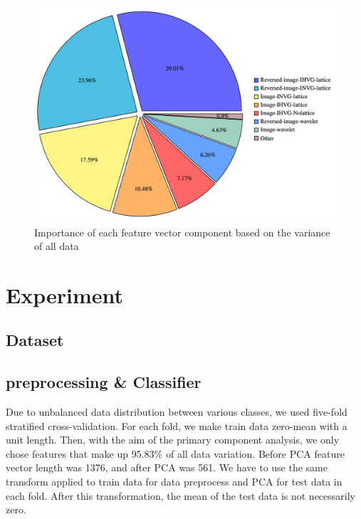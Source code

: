 \documentclass[conference]{IEEEtran}
\begin{document}
\begin{figure}[tbh]
  \includegraphics[width=1\linewidth]{PCA_piechart.png}
      \caption{Importance of each feature vector component based on the variance of all data}
  \label{fig: PCA1}
\end{figure}





\section{Experiment}
\subsection{\textbf{Dataset}}
\subsection{\textbf{preprocessing \& Classifier}}

Due to unbalanced data distribution between various classes, we used five-fold stratified cross-validation. For each fold, we make train data zero-mean with a unit length. Then, with the aim of the primary component analysis, we only chose features that make up 95.83\% of all data variation. Before PCA feature vector length was 1376, and after PCA was 561. We have to use the same transform applied to train data for data preprocess and PCA for test data in each fold. After this transformation, the mean of the test data is not necessarily zero.
\end{document}
